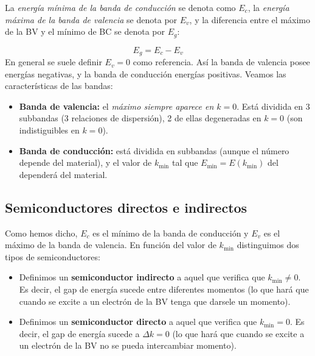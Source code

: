 La \textit{energía mínima de la banda de conducción} se denota como $E_c$, la \textit{energía máxima de la banda de valencia} se denota por $E_v$, y la diferencia entre el máximo de la BV y el mínimo de BC se denota por $E_g$:

\begin{equation}
	E_g = E_c - E_v
\end{equation}
En general se suele definir $E_v=0$ como referencia. Así la banda de valencia posee energías negativas, y la banda de conducción energías positivas. Veamos las características de las bandas:

\begin{itemize}
	\item \textbf{Banda de valencia:} el \textit{máximo siempre aparece en $k=0$}. Está dividida en 3 subbandas (3 relaciones de dispersión), 2 de ellas degeneradas en $k=0$ (son indistiguibles en $k=0$).
	\item \textbf{Banda de conducción:} está dividida en subbandas (aunque el número depende del material), y el valor de $k_{\min}$ tal que $E_{\min}=E(k_{\min})$ del dependerá del material.
\end{itemize}


\subsection{Semiconductores directos e indirectos}

Como hemos dicho, $E_c$ es el mínimo de la banda de conducción y $E_v$ es el máximo de la banda de valencia. En función del valor de $k_{\min}$ distinguimos dos tipos de semiconductores:
\begin{itemize}
	\item Definimos un \textbf{semiconductor indirecto} a aquel que verifica que $k_{\min}\neq0$. Es decir, el gap de energía sucede entre diferentes momentos (lo que hará que cuando se excite a un electrón de la BV tenga que darsele un momento).
	\item Definimos un \textbf{semiconductor directo} a aquel que verifica que $k_{\min}=0$. Es decir, el gap de energía sucede a $\Delta k =0$ (lo que hará que cuando se excite a un electrón de la BV no se pueda intercambiar momento).
\end{itemize}


